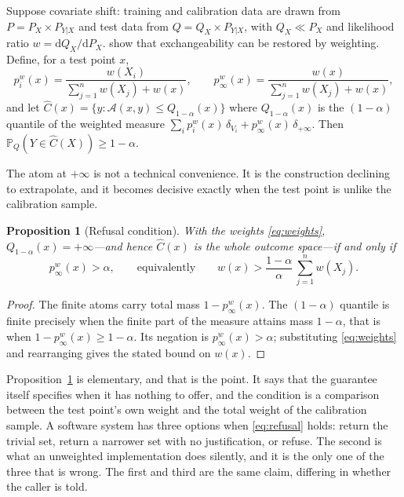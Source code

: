 \documentclass[11pt,a4paper]{article}
\newtheorem{proposition}{Proposition}
\theoremstyle{definition}
\begin{document}
Suppose covariate shift: training and calibration data are drawn from
$P = P_X \times P_{Y|X}$ and test data from $Q = Q_X \times P_{Y|X}$, with
$Q_X \ll P_X$ and likelihood ratio $w = \mathrm{d}Q_X/\mathrm{d}P_X$.
\citet{tibshirani2019} show that exchangeability can be restored by weighting.
Define, for a test point $x$,
\begin{equation}
  p_i^w(x) = \frac{w(X_i)}{\sum_{j=1}^{n} w(X_j) + w(x)},
  \qquad
  p_\infty^w(x) = \frac{w(x)}{\sum_{j=1}^{n} w(X_j) + w(x)},
  \label{eq:weights}
\end{equation}
and let $\hat C(x) = \{ y : \mathcal{A}(x,y) \le Q_{1-\alpha}(x)\}$ where
$Q_{1-\alpha}(x)$ is the $(1-\alpha)$ quantile of the weighted measure
$\sum_i p_i^w(x)\,\delta_{V_i} + p_\infty^w(x)\,\delta_{+\infty}$. Then
$\mathbb{P}_{Q}(Y \in \hat C(X)) \ge 1-\alpha$.

The atom at $+\infty$ is not a technical convenience. It is the construction
declining to extrapolate, and it becomes decisive exactly when the test point
is unlike the calibration sample.

\begin{proposition}[Refusal condition]
\label{prop:refusal}
With the weights \eqref{eq:weights}, $Q_{1-\alpha}(x) = +\infty$---and hence
$\hat C(x)$ is the whole outcome space---if and only if
\begin{equation}
  p_\infty^w(x) > \alpha,
  \qquad\text{equivalently}\qquad
  w(x) > \frac{1-\alpha}{\alpha}\,\sum_{j=1}^{n} w(X_j).
  \label{eq:refusal}
\end{equation}
\end{proposition}

\begin{proof}
The finite atoms carry total mass $1 - p_\infty^w(x)$. The $(1-\alpha)$
quantile is finite precisely when the finite part of the measure attains mass
$1-\alpha$, that is when $1 - p_\infty^w(x) \ge 1-\alpha$. Its negation is
$p_\infty^w(x) > \alpha$; substituting \eqref{eq:weights} and rearranging gives
the stated bound on $w(x)$.
\end{proof}

Proposition~\ref{prop:refusal} is elementary, and that is the point. It says
that the guarantee itself specifies when it has nothing to offer, and the
condition is a comparison between the test point's own weight and the total
weight of the calibration sample. A software system has three options when
\eqref{eq:refusal} holds: return the trivial set, return a narrower set with no
justification, or refuse. The second is what an unweighted implementation does
silently, and it is the only one of the three that is wrong. The first and
third are the same claim, differing in whether the caller is told.
\end{document}
